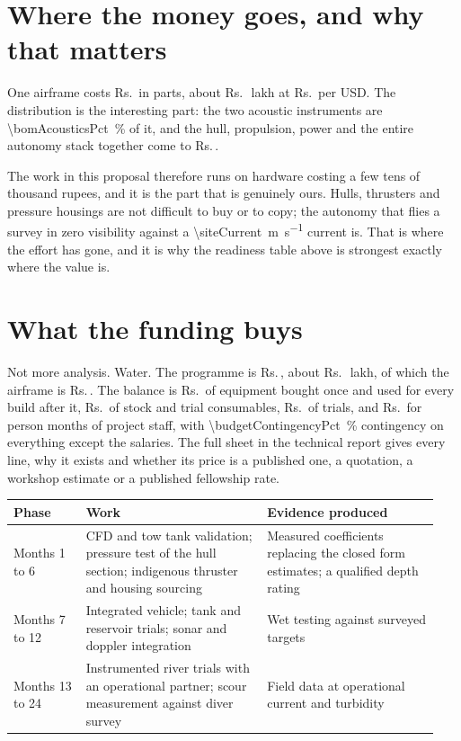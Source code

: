 \documentclass[10pt,a4paper]{article}
\newcommand{\rupeesign}{Rs.}
\newcommand{\INR}[1]{Rs.\,#1}
\begin{document}
\section*{Where the money goes, and why that matters}

One airframe costs \INR{\bomTotal} in parts, about \INR{\bomLakh{}~lakh}
at \rupeesign\,\bomRate{} per USD. The distribution is the interesting part:
the two acoustic instruments are \SI{\bomAcousticsPct}{\percent} of it, and
the hull, propulsion, power and the entire autonomy stack together come to
\INR{\bomRest}.

The work in this proposal therefore runs on hardware costing a few tens of
thousand rupees, and it is the part that is genuinely ours. Hulls, thrusters and
pressure housings are not difficult to buy or to copy; the autonomy that flies
a survey in zero visibility against a \SI{\siteCurrent}{\metre\per\second}
current is. That is where the effort has gone, and it is why the readiness
table above is strongest exactly where the value is.

\section*{What the funding buys}

Not more analysis. Water. The programme is \INR{\budgetProgramme}, about
\INR{\budgetProgrammeLakh{}~lakh}, of which the airframe is \INR{\bomTotal}.
The balance is \INR{\budgetCapital} of equipment bought once and used for every
build after it, \INR{\budgetMaterials} of stock and trial consumables,
\INR{\budgetValidation} of trials, and \INR{\budgetManpower} for
\budgetManpowerMonths{} person months of project staff, with
\SI{\budgetContingencyPct}{\percent} contingency on everything except the
salaries. The full sheet in the technical report gives every line, why it
exists and whether its price is a published one, a quotation, a workshop
estimate or a published fellowship rate.

\begin{center}\small
\begin{tabular}{@{}p{0.16\linewidth}p{0.40\linewidth}p{0.38\linewidth}@{}}
\toprule
\textbf{Phase} & \textbf{Work} & \textbf{Evidence produced} \\
\midrule
Months 1 to 6 & CFD and tow tank validation; pressure test of the hull
section; indigenous thruster and housing sourcing &
Measured coefficients replacing the closed form estimates; a qualified depth
rating \\
Months 7 to 12 & Integrated vehicle; tank and reservoir trials; sonar and
doppler integration & Wet testing against surveyed targets \\
Months 13 to 24 & Instrumented river trials with an operational partner;
scour measurement against diver survey & Field data at operational current
and turbidity \\
\bottomrule
\end{tabular}
\end{center}
\end{document}

